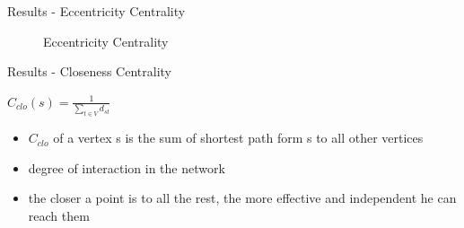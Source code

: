 \begin{frame}{Results - Eccentricity Centrality}
	\begin{figure}
	\hfill
	\caption{Eccentricity Centrality}
	\end{figure}
\end{frame}
\begin{frame}{Results - Closeness Centrality}
	\begin{definition}
		$C_{clo}(s) = \frac{1}{\sum\limits_{t\in V} d_{st}}$
	\end{definition}
	\begin{itemize}
		\item $C_{clo}$ of a vertex s is the sum of shortest path form s to all other vertices  
		\item degree of interaction in the network
		\item the closer a point is to all the rest, the more effective and independent he can reach them
	\end{itemize}
\end{frame}
